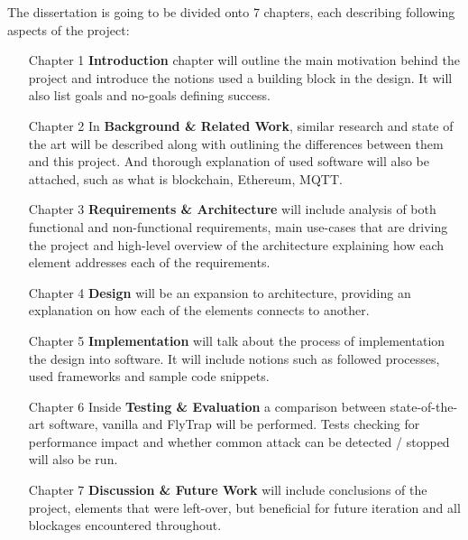 The dissertation is going to be divided onto 7 chapters, each describing following aspects of the project:
\begin{itemize}[leftmargin=4.5em]
  \item[Chapter 1] \textbf{Introduction} chapter will outline the main motivation behind the project and introduce the notions used a building block in the design. It will also list goals and no-goals defining success.
  \item[Chapter 2] In \textbf{Background \& Related Work}, similar research and state of the art will be described along with outlining the differences between them and this project. And thorough explanation of used software will also be attached, such as what is blockchain, Ethereum, MQTT. 
  \item[Chapter 3] \textbf{Requirements \& Architecture} will include analysis of both functional and non-functional requirements, main use-cases that are driving the project and high-level overview of the architecture explaining how each element addresses each of the requirements.
  \item[Chapter 4] \textbf{Design} will be an expansion to architecture, providing an explanation on how each of the elements connects to another.
  \item[Chapter 5] \textbf{Implementation} will talk about the process of implementation the design into software. It will include notions such as followed processes, used frameworks and sample code snippets.
  \item[Chapter 6] Inside \textbf{Testing \& Evaluation} a comparison between state-of-the-art software, vanilla and FlyTrap will be performed. Tests checking for performance impact and whether common attack can be detected / stopped will also be run.
  \item[Chapter 7] \textbf{Discussion \& Future Work} will include conclusions of the project, elements that were left-over, but beneficial for future iteration and all blockages encountered throughout. 
\end{itemize}

